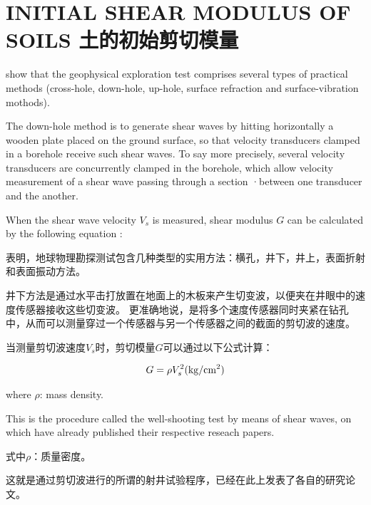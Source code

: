 \section*{INITIAL SHEAR MODULUS OF SOILS 土的初始剪切模量}


\begin{paracol}{2}
    
    \citet{Miller1972545}  show that the geophysical exploration test comprises several types of practical methods (cross-hole, down-hole, up-hole, surface refraction and surface-vibration mothods).
    
    The down-hole method is to generate shear waves by hitting horizontally a wooden plate placed on the ground surface, so that velocity transducers clamped in a borehole receive such shear waves. To say more precisely, several velocity transducers are concurrently clamped in the borehole, which allow velocity measurement of a shear wave passing through a section ·between one transducer and the another.
    
    When the shear wave velocity $V_s$ is measured, shear modulus $G$ can be calculated by the following equation :

    \switchcolumn

    \citet{Miller1972545}表明，地球物理勘探测试包含几种类型的实用方法：横孔，井下，井上，表面折射和表面振动方法。
    
    井下方法是通过水平击打放置在地面上的木板来产生切变波，以便夹在井眼中的速度传感器接收这些切变波。 更准确地说，是将多个速度传感器同时夹紧在钻孔中，从而可以测量穿过一个传感器与另一个传感器之间的截面的剪切波的速度。
    
    当测量剪切波速度$V_s$时，剪切模量$G$可以通过以下公式计算：

\end{paracol}
    
    \begin{align}
        G=\rho{}V_s^2(\rm{kg/cm^2})
        \label{equation:1}
    \end{align}

\begin{paracol}{2}
    \noindent where $\rho$: mass density.

    This is the procedure called the well-shooting test by means of shear waves, on which \citet{Kitsunezaki19671,Shima19681301, Shima1969819, Imai197017} have already published their respective reseach papers.

    \switchcolumn

    \noindent 式中$\rho$：质量密度。

    这就是通过剪切波进行的所谓的射井试验程序，\citet{Kitsunezaki19671,Shima19681301, Shima1969819, Imai197017}已经在此上发表了各自的研究论文。

\end{paracol}

